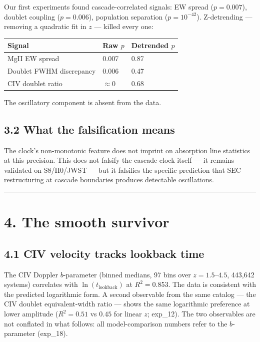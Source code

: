 \documentclass[11pt,a4paper]{article}
\begin{document}
Our first experiments found cascade-correlated signals: EW spread ($p = 0.007$), doublet coupling ($p = 0.006$), population separation ($p = 10^{-42}$). Z-detrending — removing a quadratic fit in $z$ — killed every one:

\begin{longtable}[]{@{}lll@{}}
\toprule
Signal & Raw $p$ & Detrended $p$ \\
\midrule\endhead
MgII EW spread & 0.007 & 0.87 \\
Doublet FWHM discrepancy & 0.006 & 0.47 \\
CIV doublet ratio & $\approx 0$ & 0.68 \\
\bottomrule
\end{longtable}

The oscillatory component is absent from the data.

\subsection*{3.2 What the falsification means}

The clock's non-monotonic feature does not imprint on absorption line statistics at this precision. This does not falsify the cascade clock itself — it remains validated on S8/H0/JWST — but it falsifies the specific prediction that SEC restructuring at cascade boundaries produces detectable oscillations.

\begin{center}\rule{0.5\linewidth}{0.4pt}\end{center}

\section*{4. The smooth survivor}

\subsection*{4.1 CIV velocity tracks lookback time}

The CIV Doppler $b$-parameter (binned medians, 97 bins over $z = 1.5$–$4.5$, 443,642 systems) correlates with $\ln(t_\text{lookback})$ at $R^2 = 0.853$. The data is consistent with the predicted logarithmic form. A second observable from the same catalog — the CIV doublet equivalent-width ratio — shows the same logarithmic preference at lower amplitude ($R^2 = 0.51$ vs $0.45$ for linear $z$; exp\_12). The two observables are not conflated in what follows: all model-comparison numbers refer to the $b$-parameter (exp\_18).
\end{document}
